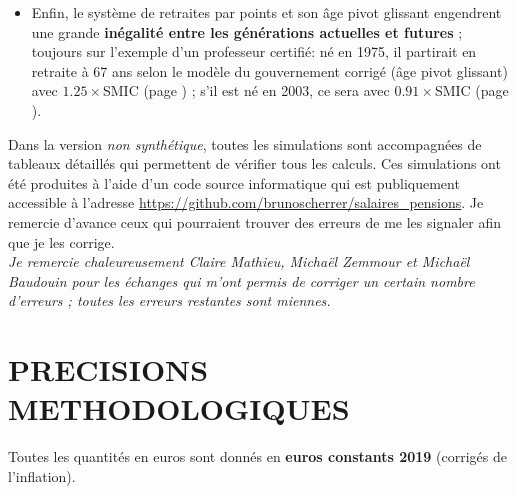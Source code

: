 \begin{itemize}
\item Enfin, le système de retraites par points et son âge pivot glissant engendrent une grande {\bf inégalité entre les générations actuelles et futures} ; toujours sur l'exemple d'un professeur certifié: né en 1975, il partirait en retraite à 67 ans selon le modèle du gouvernement corrigé (âge pivot glissant) avec $1.25\times$SMIC (page \pageref{ProfEcoles_100_1975_22_0}) ; s'il est né en 2003, ce sera avec $0.91\times$SMIC (page \pageref{ProfEcoles_100_2003_22_0}).
\end{itemize}

\vspace{.2cm}

{\small
Dans la version \emph{non synthétique}, toutes les simulations sont accompagnées de tableaux détaillés qui permettent de vérifier tous les calculs. Ces simulations ont été produites à l'aide d'un code source informatique qui est publiquement accessible à l'adresse \url{https://github.com/brunoscherrer/salaires_pensions}. Je remercie d'avance ceux qui pourraient trouver des erreurs de me les signaler afin que je les corrige. \\
\emph{Je remercie chaleureusement Claire Mathieu, Michaël Zemmour et Michaël Baudouin pour les échanges qui m'ont permis de corriger un certain nombre d'erreurs ; toutes les erreurs restantes sont miennes.}
}

\newpage

{\small
\setcounter{tocdepth}{0}
\begingroup
\let\clearpage\relax
\tableofcontents
\endgroup
}

\chapter*{PRECISIONS METHODOLOGIQUES}
\label{modeles}

Toutes les quantités en euros sont donnés en {\bf euros constants 2019} (corrigés de l'inflation).

